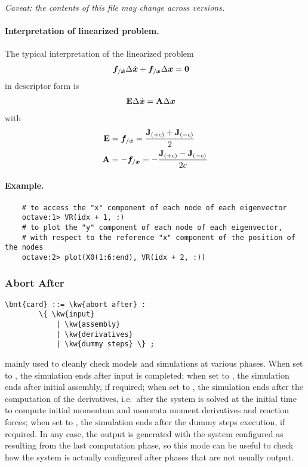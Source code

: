 \emph{Caveat: the contents of this file may change across versions.}

\paragraph{Interpretation of linearized problem.}
The typical interpretation of the linearized problem
\begin{align}
	\boldsymbol{f}_{/\dot{\boldsymbol{x}}} \Delta\dot{\boldsymbol{x}} + \boldsymbol{f}_{/\boldsymbol{x}} \Delta\boldsymbol{x} &= \boldsymbol{0}
\end{align}
in descriptor form is
\begin{align}
	\bm{\mathbf E} \Delta\dot{\boldsymbol{x}} &= \bm{\mathbf A} \Delta\boldsymbol{x}
\end{align}
with
\begin{subequations}
\begin{align}
	\bm{\mathbf E} &= \boldsymbol{f}_{/\dot{\boldsymbol{x}}} = \frac{\bm{\mathbf J}_{(+c)} + \bm{\mathbf J}_{(-c)}}{2}
	\\
	\bm{\mathbf A} &= - \boldsymbol{f}_{/\boldsymbol{x}} = - \frac{\bm{\mathbf J}_{(+c)} - \bm{\mathbf J}_{(-c)}}{2 c}
\end{align}
\end{subequations}


\paragraph{Example.}
\begin{verbatim}
    # to access the "x" component of each node of each eigenvector
    octave:1> VR(idx + 1, :)
    # to plot the "y" component of each node of each eigenvector,
    # with respect to the reference "x" component of the position of the nodes
    octave:2> plot(X0(1:6:end), VR(idx + 2, :))
\end{verbatim}



\subsubsection{Abort After}
\label{sec:IVP:abort after}
\begin{Verbatim}[commandchars=\\\{\}]
    \bnt{card} ::= \kw{abort after} :
        \{ \kw{input} 
            | \kw{assembly}
            | \kw{derivatives}
            | \kw{dummy steps} \} ;
\end{Verbatim}
mainly used to cleanly check models and simulations at various phases.
When set to , the simulation ends after input is completed;
when set to , the simulation ends after initial assembly,
if required;
when set to , the simulation ends after the computation
of the derivatives, i.e.\ after the system is solved at the initial
time to compute initial momentum and momenta moment derivatives and 
reaction forces;
when set to , the simulation ends after the dummy steps
execution, if required.
In any case, the output is generated with the system configured 
as resulting from the last computation phase, so this mode can be useful 
to check how the system is actually configured after phases that are not 
usually output.


